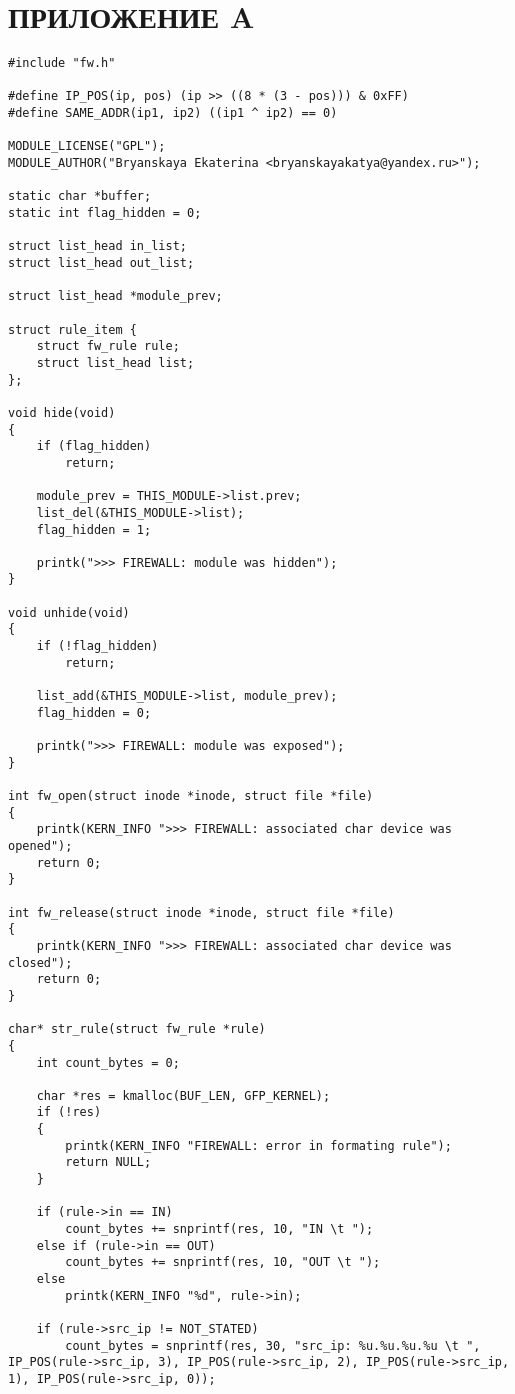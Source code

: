 \section*{ПРИЛОЖЕНИЕ A}
\begin{lstlisting}[caption = {fw\_module.c}]
#include "fw.h"

#define IP_POS(ip, pos) (ip >> ((8 * (3 - pos))) & 0xFF)
#define SAME_ADDR(ip1, ip2) ((ip1 ^ ip2) == 0)

MODULE_LICENSE("GPL");
MODULE_AUTHOR("Bryanskaya Ekaterina <bryanskayakatya@yandex.ru>");

static char *buffer;
static int flag_hidden = 0;

struct list_head in_list;
struct list_head out_list;

struct list_head *module_prev;

struct rule_item {
	struct fw_rule rule;
	struct list_head list;    
};

void hide(void)
{
	if (flag_hidden)
		return;
	
	module_prev = THIS_MODULE->list.prev;
	list_del(&THIS_MODULE->list);
	flag_hidden = 1;
	
	printk(">>> FIREWALL: module was hidden");
}

void unhide(void)
{
	if (!flag_hidden)
		return;
	
	list_add(&THIS_MODULE->list, module_prev);
	flag_hidden = 0;
	
	printk(">>> FIREWALL: module was exposed");
} 

int fw_open(struct inode *inode, struct file *file)
{
	printk(KERN_INFO ">>> FIREWALL: associated char device was opened");
	return 0;
}

int fw_release(struct inode *inode, struct file *file)
{
	printk(KERN_INFO ">>> FIREWALL: associated char device was closed");
	return 0;
}

char* str_rule(struct fw_rule *rule)
{
	int count_bytes = 0;
	
	char *res = kmalloc(BUF_LEN, GFP_KERNEL);
	if (!res)
	{
		printk(KERN_INFO "FIREWALL: error in formating rule");
		return NULL;
	}
	
	if (rule->in == IN)
		count_bytes += snprintf(res, 10, "IN \t ");
	else if (rule->in == OUT)
		count_bytes += snprintf(res, 10, "OUT \t ");
	else
		printk(KERN_INFO "%d", rule->in);
	
	if (rule->src_ip != NOT_STATED)
		count_bytes = snprintf(res, 30, "src_ip: %u.%u.%u.%u \t ", IP_POS(rule->src_ip, 3), IP_POS(rule->src_ip, 2), IP_POS(rule->src_ip, 1), IP_POS(rule->src_ip, 0));
	

\end{lstlisting}
